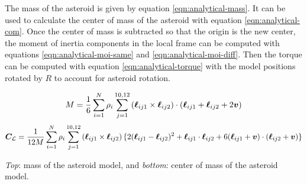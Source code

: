 \documentclass[aps,twocolumn,secnumarabic,balancelastpage,amsmath,amssymb,nofootinbib,floatfix]{revtex4-1}
\begin{document}
The mass of the asteroid is given by equation \ref{eqn:analytical-mass}. It can be used to calculate the center of mass of the asteroid with equation \ref{eqn:analytical-com}. Once the center of mass is subtracted so that the origin is the new center, the moment of inertia components in the local frame can be computed with equations \ref{eqn:analytical-moi-same} and  \ref{eqn:analytical-moi-diff}. Then the torque can be computed with equation \ref{eqn:analytical-torque} with the model positions rotated by $R$ to account for asteroid rotation.

\begin{table*} 
    \begin{equation}
        M = \frac{1}{6}\sum_{i=1}^N\rho_i \sum_{j=1}^{10, 12} \left( \bm\ell_{ij1} \times \bm\ell_{ij2} \right) \cdot (\bm \ell_{ij1} + \bm \ell_{ij2} + 2\bm v)
        \label{eqn:analytical-mass}
    \end{equation}
    \begin{equation}
        \bm C_\mathcal{L} = \frac{1}{12M}\sum_{i=1}^N\rho_i \sum_{j=1}^{10, 12} \left( \bm\ell_{ij1} \times \bm\ell_{ij2} \right) \{2(\bm \ell_{ij1} - \bm \ell_{ij2})^2 + \bm \ell_{ij1}\cdot  \bm \ell_{ij2} + 6(\bm \ell_{ij1}+ \bm v)\cdot (\bm \ell_{ij2} + \bm v)\}
        \label{eqn:analytical-com}
    \end{equation}
    \caption*{\textit{Top}: mass of the asteroid model, and \textit{bottom}: center of mass of the asteroid model. }
\end{table*}
\end{document}
